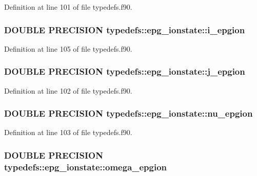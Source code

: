 Definition at line 101 of file typedefs.f90.\hypertarget{typetypedefs_1_1epg__ionstate_a6a8f71bd76a8bc224110dddd0879e737}{
\subsubsection[{i\_\-epgion}]{\setlength{\rightskip}{0pt plus 5cm}DOUBLE PRECISION {\bf typedefs::epg\_\-ionstate::i\_\-epgion}}}
\label{typetypedefs_1_1epg__ionstate_a6a8f71bd76a8bc224110dddd0879e737}


Definition at line 105 of file typedefs.f90.\hypertarget{typetypedefs_1_1epg__ionstate_af58a6a50862ca7fa102f7cfb4fbfa048}{
\subsubsection[{j\_\-epgion}]{\setlength{\rightskip}{0pt plus 5cm}DOUBLE PRECISION {\bf typedefs::epg\_\-ionstate::j\_\-epgion}}}
\label{typetypedefs_1_1epg__ionstate_af58a6a50862ca7fa102f7cfb4fbfa048}


Definition at line 102 of file typedefs.f90.\hypertarget{typetypedefs_1_1epg__ionstate_a223a1bee73dd96f76979196b8eced4ff}{
\subsubsection[{nu\_\-epgion}]{\setlength{\rightskip}{0pt plus 5cm}DOUBLE PRECISION {\bf typedefs::epg\_\-ionstate::nu\_\-epgion}}}
\label{typetypedefs_1_1epg__ionstate_a223a1bee73dd96f76979196b8eced4ff}


Definition at line 103 of file typedefs.f90.\hypertarget{typetypedefs_1_1epg__ionstate_a83358e3fa4910f5d22f255d17ac27210}{
\subsubsection[{omega\_\-epgion}]{\setlength{\rightskip}{0pt plus 5cm}DOUBLE PRECISION {\bf typedefs::epg\_\-ionstate::omega\_\-epgion}}}
\label{typetypedefs_1_1epg__ionstate_a83358e3fa4910f5d22f255d17ac27210}


